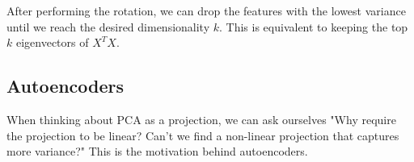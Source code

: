 \documentclass[12pt]{article}  %
\begin{document}
After performing the rotation, we can drop the features with the lowest variance until we reach the desired dimensionality $k$. This is equivalent to keeping the top $k$ eigenvectors of $X^TX$.

\subsection{Autoencoders}

When thinking about PCA as a projection, we can ask ourselves "Why require the projection to be linear? Can't we find a non-linear projection that captures more variance?" This is the motivation behind autoencoders.
\end{document}
